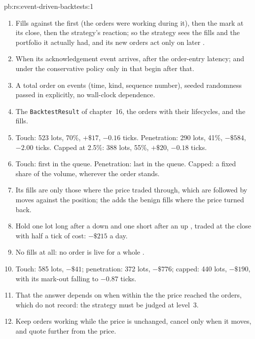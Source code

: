 \begin{solution}{pb:rs:event-driven-backtests:1}
\begin{enumerate}
\item Fills against the  first (the orders were working during it), then the mark at its close, then the strategy's reaction; so the strategy sees
the fills and the portfolio it actually had, and its new orders act only on later .
\item When its acknowledgement event arrives, after the order-entry latency; and under the conservative policy only in  that begin after that.
\item A total order on events (time, kind, sequence number), seeded randomness passed in explicitly, no wall-clock dependence.
\item The \texttt{BacktestResult} of chapter~16, the orders with their lifecycles, and the fills.
\item Touch: 523 lots, 70\%, $+\$17$, $-0.16$ ticks. Penetration: 290 lots, 41\%, $-\$584$, $-2.00$ ticks. Capped at 2.5\%: 388 lots, 55\%, $+\$20$,
$-0.18$ ticks.
\item Touch: first in the queue. Penetration: last in the queue. Capped: a fixed share of the volume, wherever the order stands.
\item Its fills are only those where the price traded through, which are followed by moves against the position; the  adds the benign fills
where the price turned back.
\item Hold one lot long after a down  and one short after an up , traded at the close with half a tick of cost: $-\$215$ a day.
\item No fills at all: no order is live for a whole .
\item Touch: 585 lots, $-\$41$; penetration: 372 lots, $-\$776$; capped: 440 lots, $-\$190$, with its mark-out falling to $-0.87$ ticks.
\item That the answer depends on when within the  the price reached the orders, which  do not record: the strategy must be judged at level~3.
\item Keep orders working while the price is unchanged, cancel only when it moves, and quote further from the price.

\end{enumerate}
\end{solution}
